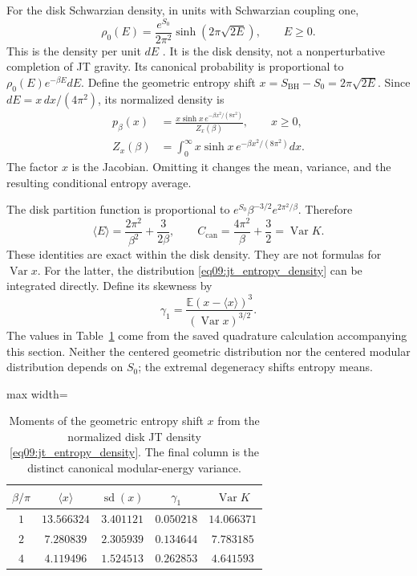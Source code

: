 \documentclass[11pt,letterpaper]{article}
\theoremstyle{plain}
\theoremstyle{definition}
\theoremstyle{remark}
\begin{document}
For the disk Schwarzian density, in units with Schwarzian coupling one,
\begin{equation}
 \rho_0(E)=\frac{e^{S_0}}{2\pi^2}
       \sinh(2\pi\sqrt{2E}),\qquad E\geq0.
 \label{eq09:schwarzian_energy}
\end{equation}
This is the density per unit $dE$ \citep{saadetal2019}. It is the disk
density, not a nonperturbative completion of JT gravity. Its canonical
probability is proportional to $\rho_0(E)e^{-\beta E}dE$.
Define the geometric entropy shift $x=S_{\mathrm{BH}}-S_0=2\pi\sqrt{2E}$.
Since $dE=x\,dx/(4\pi^2)$, its normalized density is
\begin{align}
 p_\beta(x)&=\frac{x\sinh x\,e^{-\beta x^2/(8\pi^2)}}{Z_x(\beta)},
 \qquad x\geq0,\nonumber\\
 Z_x(\beta)&=\int_0^\infty x\sinh x\,e^{-\beta x^2/(8\pi^2)}dx.
 \label{eq09:jt_entropy_density}
\end{align}
The factor $x$ is the Jacobian. Omitting it changes the mean, variance, and
the resulting conditional entropy average.

The disk partition function is proportional to
$e^{S_0}\beta^{-3/2}e^{2\pi^2/\beta}$. Therefore
\begin{equation}
 \langle E\rangle=\frac{2\pi^2}{\beta^2}+\frac{3}{2\beta},
 \qquad C_{\mathrm{can}}=\frac{4\pi^2}{\beta}+\frac32
                      =\operatorname{Var}K.
 \label{eq09:jt_modular_variance}
\end{equation}
These identities are exact within the disk density. They are not formulas
for $\operatorname{Var}x$. For the latter, the distribution
\eqref{eq09:jt_entropy_density} can be integrated directly. Define its
skewness by
\begin{equation}
 \gamma_1=\frac{\mathbb E(x-\langle x\rangle)^3}
               {(\operatorname{Var}x)^{3/2}}.
 \label{eq09:skewness}
\end{equation}
The values in Table~\ref{tab09:jt_moments} come from the saved quadrature
calculation accompanying this section. Neither the centered geometric
distribution nor the centered modular distribution depends on $S_0$;
the extremal degeneracy shifts entropy means.

\begin{table}[t]
 \centering
 \caption{Moments of the geometric entropy shift $x$ from the normalized
 disk JT density \eqref{eq09:jt_entropy_density}. The final column is the
 distinct canonical modular-energy variance.}
 \label{tab09:jt_moments}
 \begin{adjustbox}{max width=\textwidth}
 \begin{tabular}{ccccc}
 \toprule
 $\beta/\pi$ & $\langle x\rangle$ & $\operatorname{sd}(x)$
 & $\gamma_1$ & $\operatorname{Var}K$\\
 \midrule
 $1$ & $13.566324$ & $3.401121$ & $0.050218$ & $14.066371$\\
 $2$ & $7.280839$  & $2.305939$ & $0.134644$ & $7.783185$\\
 $4$ & $4.119496$  & $1.524513$ & $0.262853$ & $4.641593$\\
 \bottomrule
 \end{tabular}
 \end{adjustbox}
\end{table}
\end{document}
